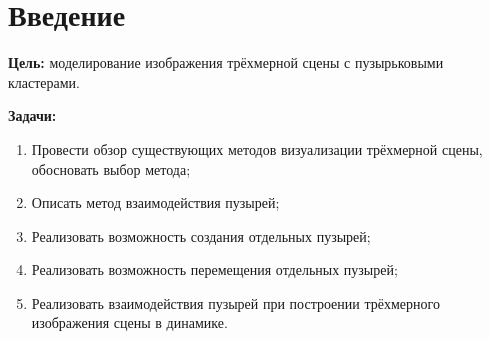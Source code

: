 \chapter*{Введение}
\textbf{Цель:} моделирование изображения трёхмерной сцены с пузырьковыми кластерами.

\textbf{Задачи:}
\begin{enumerate}[label={\arabic*)}]
	\item Провести обзор существующих методов визуализации трёхмерной сцены, обосновать выбор метода;
	\item Описать метод взаимодействия пузырей;
	\item Реализовать возможность создания отдельных пузырей;
	\item Реализовать возможность перемещения отдельных пузырей;
	\item Реализовать взаимодействия пузырей при построении трёхмерного изображения сцены в динамике.
\end{enumerate}